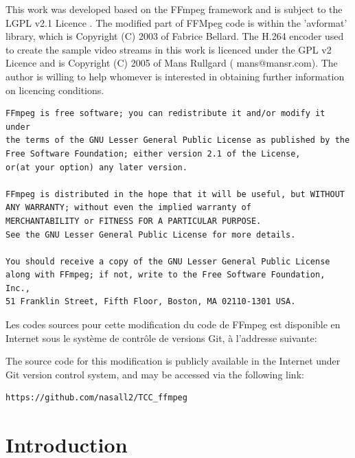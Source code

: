 \documentclass[12pt,a4paper]{article}
\begin{document}
\-\newline
This work was developed based on the FFmpeg\cite{ffmpeg} framework and is subject to the LGPL v2.1 Licence \cite{gplv2}. The modified part of FFMpeg code is within the 'avformat' library, which is Copyright (C) 2003 of Fabrice Bellard. The H.264 encoder used to create the sample video streams in this work is licenced under the GPL v2 Licence and is Copyright (C) 2005 of Mans Rullgard ( mans@mansr.com). The author is willing to help whomever is interested in obtaining further information on licencing conditions.

\-\newline
\begin{minipage}{\linewidth}
\begin{lstlisting}[]
FFmpeg is free software; you can redistribute it and/or modify it under
the terms of the GNU Lesser General Public License as published by the
Free Software Foundation; either version 2.1 of the License,
or(at your option) any later version.

FFmpeg is distributed in the hope that it will be useful, but WITHOUT
ANY WARRANTY; without even the implied warranty of
MERCHANTABILITY or FITNESS FOR A PARTICULAR PURPOSE.
See the GNU Lesser General Public License for more details.

You should receive a copy of the GNU Lesser General Public License
along with FFmpeg; if not, write to the Free Software Foundation, Inc.,
51 Franklin Street, Fifth Floor, Boston, MA 02110-1301 USA.
\end{lstlisting}
\end{minipage}

\-\newline
Les codes sources pour cette modification du code de FFmpeg est disponible en Internet sous le système de contrôle de versions Git, à l'addresse suivante:

\-\newline
The source code for this modification is publicly available in the Internet under Git version control system, and may be accessed via the following link:
\begin{verbatim}
https://github.com/nasall2/TCC_ffmpeg
\end{verbatim}


\newpage
\section{Introduction}
\end{document}
